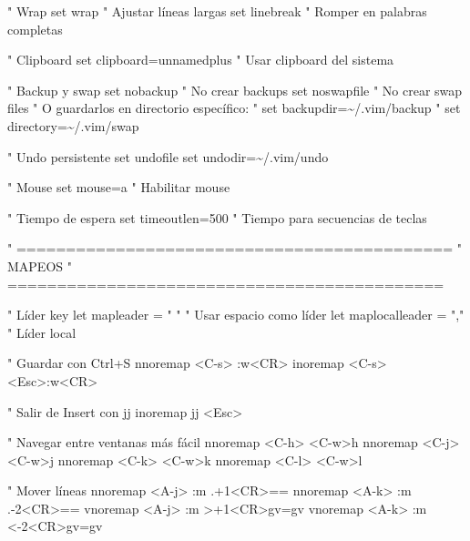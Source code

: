 \documentclass[
  doc,
  floatsintext,
  longtable,
  a4paper,
  nolmodern,
  notxfonts,
  notimes,
  12pt,
  colorlinks=true,linkcolor=blue,citecolor=blue,urlcolor=blue]{apa7}
\newenvironment{Shaded}{\begin{snugshade}}{\end{snugshade}}
\newcommand{\NormalTok}[1]{\textcolor[rgb]{0.00,0.23,0.31}{#1}}
\begin{document}
\begin{Shaded}
\begin{Highlighting}[]
\NormalTok{" Wrap}
\NormalTok{set wrap            " Ajustar líneas largas}
\NormalTok{set linebreak       " Romper en palabras completas}

\NormalTok{" Clipboard}
\NormalTok{set clipboard=unnamedplus  " Usar clipboard del sistema}

\NormalTok{" Backup y swap}
\NormalTok{set nobackup        " No crear backups}
\NormalTok{set noswapfile      " No crear swap files}
\NormalTok{" O guardarlos en directorio específico:}
\NormalTok{" set backupdir=\textasciitilde{}/.vim/backup}
\NormalTok{" set directory=\textasciitilde{}/.vim/swap}

\NormalTok{" Undo persistente}
\NormalTok{set undofile}
\NormalTok{set undodir=\textasciitilde{}/.vim/undo}

\NormalTok{" Mouse}
\NormalTok{set mouse=a         " Habilitar mouse}

\NormalTok{" Tiempo de espera}
\NormalTok{set timeoutlen=500  " Tiempo para secuencias de teclas}

\NormalTok{" ============================================}
\NormalTok{" MAPEOS}
\NormalTok{" ============================================}

\NormalTok{" Líder key}
\NormalTok{let mapleader = " "      " Usar espacio como líder}
\NormalTok{let maplocalleader = "," " Líder local}

\NormalTok{" Guardar con Ctrl+S}
\NormalTok{nnoremap \textless{}C{-}s\textgreater{} :w\textless{}CR\textgreater{}}
\NormalTok{inoremap \textless{}C{-}s\textgreater{} \textless{}Esc\textgreater{}:w\textless{}CR\textgreater{}}

\NormalTok{" Salir de Insert con jj}
\NormalTok{inoremap jj \textless{}Esc\textgreater{}}

\NormalTok{" Navegar entre ventanas más fácil}
\NormalTok{nnoremap \textless{}C{-}h\textgreater{} \textless{}C{-}w\textgreater{}h}
\NormalTok{nnoremap \textless{}C{-}j\textgreater{} \textless{}C{-}w\textgreater{}j}
\NormalTok{nnoremap \textless{}C{-}k\textgreater{} \textless{}C{-}w\textgreater{}k}
\NormalTok{nnoremap \textless{}C{-}l\textgreater{} \textless{}C{-}w\textgreater{}l}

\NormalTok{" Mover líneas}
\NormalTok{nnoremap \textless{}A{-}j\textgreater{} :m .+1\textless{}CR\textgreater{}==}
\NormalTok{nnoremap \textless{}A{-}k\textgreater{} :m .{-}2\textless{}CR\textgreater{}==}
\NormalTok{vnoremap \textless{}A{-}j\textgreater{} :m \textquotesingle{}\textgreater{}+1\textless{}CR\textgreater{}gv=gv}
\NormalTok{vnoremap \textless{}A{-}k\textgreater{} :m \textquotesingle{}\textless{}{-}2\textless{}CR\textgreater{}gv=gv}


\end{Highlighting}
\end{Shaded}
\end{document}
